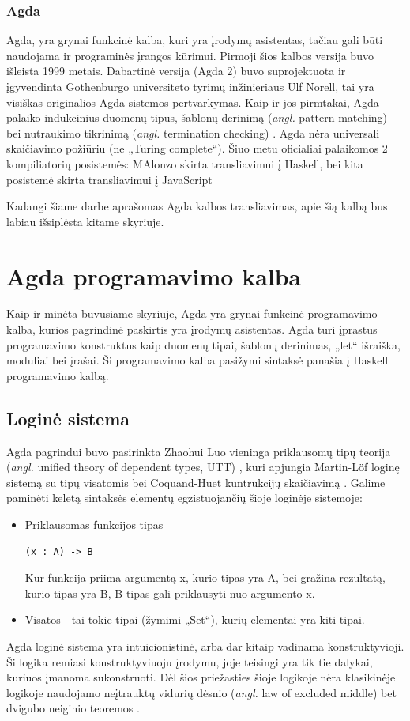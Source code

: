 \documentclass{VUMIFPSkursinis}
\begin{document}
\subsubsection{Agda}
Agda, yra grynai funkcinė kalba, kuri yra įrodymų asistentas, tačiau gali būti naudojama ir programinės įrangos kūrimui. Pirmoji šios kalbos versija buvo išleista 1999 metais. Dabartinė versija (Agda 2) buvo suprojektuota ir įgyvendinta Gothenburgo universiteto tyrimų inžinieriaus Ulf Norell, tai yra visiškas originalios Agda sistemos pertvarkymas. Kaip ir jos pirmtakai, Agda palaiko indukcinius duomenų tipus, šablonų derinimą (\textit{angl.} pattern matching) bei nutraukimo tikrinimą (\textit{angl.} termination checking) \cite{agda_overview}. Agda nėra universali skaičiavimo požiūriu (ne „Turing complete“). Šiuo metu oficialiai palaikomos 2 kompiliatorių posistemės: MAlonzo skirta transliavimui į Haskell, bei kita posistemė skirta transliavimui į JavaScript \par Kadangi šiame darbe aprašomas Agda kalbos transliavimas, apie šią kalbą bus labiau išsiplėsta kitame skyriuje.
\section{Agda programavimo kalba}
Kaip ir minėta buvusiame skyriuje, Agda yra grynai funkcinė programavimo kalba, kurios pagrindinė paskirtis yra įrodymų asistentas. Agda turi įprastus programavimo konstruktus kaip duomenų tipai, šablonų derinimas, „let“ išraiška, moduliai bei įrašai. Ši programavimo kalba pasižymi sintaksė panašia į Haskell programavimo kalbą.
\subsection{Loginė sistema}
Agda pagrindui buvo pasirinkta Zhaohui Luo vieninga priklausomų tipų teorija (\textit{angl.} unified theory of dependent types, UTT) \cite{agdaInitial}, kuri apjungia Martin-Löf loginę sistemą su tipų visatomis bei Coquand-Huet kuntrukcijų skaičiavimą \cite{schematicApproach}. Galime paminėti keletą sintaksės elementų egzistuojančių šioje loginėje sistemoje:
\begin{itemize}
	\item{ Priklausomas funkcijos tipas
		\begin{lstlisting}
(x : A) -> B
		\end{lstlisting}
		Kur funkcija priima argumentą x, kurio tipas yra A, bei gražina rezultatą, kurio tipas yra B, B tipas gali priklausyti nuo argumento x.
	}
	\item Visatos - tai tokie tipai (žymimi „Set“), kurių elementai yra kiti tipai.
\end{itemize}
Agda loginė sistema yra intuicionistinė, arba dar kitaip vadinama konstruktyvioji. Ši logika remiasi konstruktyviuoju įrodymu, joje teisingi yra tik tie dalykai, kuriuos įmanoma sukonstruoti. Dėl šios priežasties šioje logikoje nėra klasikinėje logikoje naudojamo neįtrauktų vidurių dėsnio (\textit{angl.} law of excluded middle) bet dvigubo neiginio teoremos \cite{intuitionistic}.
\end{document}
